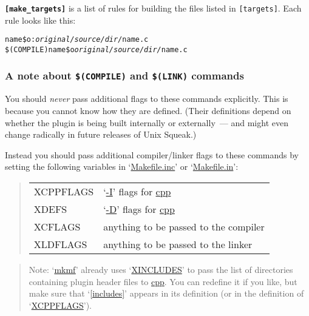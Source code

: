 \documentclass{article}
\newcommand{\cmd}{\url}
\newcommand{\cmd}{\texttt}
\newenvironment{note}{\begin{quote}\color{red} Note: }{\end{quote}}
\begin{document}
\texttt{\textbf{[make\_targets]}}
is a list of rules
for building the files listed in \texttt{[targets]}.
Each rule
looks like this:

\begin{alltt}
        name\$o : \emph{original/source/dir/}name.c
                \$(COMPILE) name\$o \emph{original/source/dir/}name.c
\end{alltt}

\subsubsection{A note about \texttt{\$(COMPILE)} and \texttt{\$(LINK)} commands}

You should \emph{never} pass additional flags to these
commands%
%
explicitly.  This is because you cannot know how they are defined.
(Their definitions depend on whether the plugin is being built
internally or externally~--- and might even change radically in future
releases of Unix Squeak.)

Instead you should pass additional compiler/linker
flags
to these commands by setting the following variables in `\cmd{Makefile.inc}' or
`\cmd{Makefile.in}':
\begin{quote}
\begin{tabular}{@{\ttfamily}l@{~~~}l}
XCPPFLAGS	& `\cmd{-I}' flags for \cmd{cpp}		\\
XDEFS		& `\cmd{-D}' flags for \cmd{cpp}		\\
XCFLAGS		& anything to be passed to the compiler	\\
XLDFLAGS	& anything to be passed to the linker	\\
\end{tabular}
\end{quote}
\begin{note}
`\cmd{mkmf}' already uses `\cmd{XINCLUDES}'
to pass the list of
directories containing plugin header files to \cmd{cpp}.  You can
redefine it if you like, but make sure that `\cmd{[includes]}'
appears in its definition (or in the definition of `\cmd{XCPPFLAGS}').
\end{note}
\end{document}
